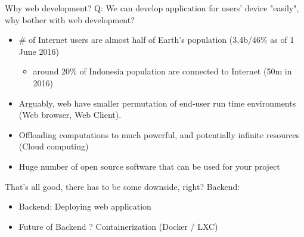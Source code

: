 \documentclass{beamer}
\begin{document}
  
  \begin{frame}{Why web development?}
	\pause
	Q: We can develop application for users' device "easily", why bother with web development?

	\pause
	\begin{itemize}[<+->]
	
		\item \# of Internet users are almost half of Earth's population (3,4b/46\% as of 1 June 2016)\footnotemark[1]
			\begin{itemize}[<+->]
				\item around 20\% of Indonesia population are connected to Internet (50m in 2016\footnotemark[1])
			\end{itemize}
			
		\item Arguably, web have smaller permutation of end-user run time environments (Web browser, Web Client).
		
		\item Offloading computations to much powerful, and potentially infinite resources (Cloud computing)
		
		\item Huge number of open source software that can be used for your project
		
	\end{itemize}

  \end{frame}
  
  
  
  \begin{frame}{That's all good, there has to be some downside, right?}
  	\pause
	Backend:
	\pause
	\begin{itemize}[<+->]
		\item Backend: Deploying web application
		\item Future of Backend ? \pause Containerization (Docker / LXC)
  	\end{itemize}
  \end{frame}
  
\end{document}
